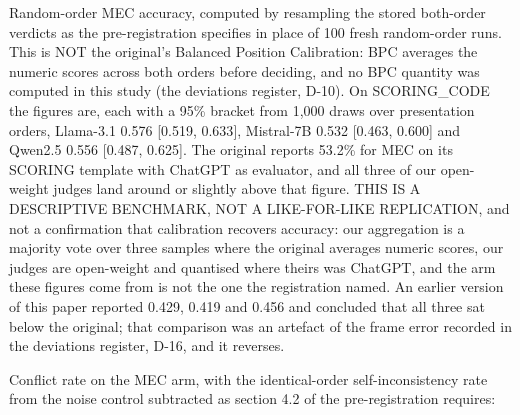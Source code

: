 Random-order MEC accuracy, computed by resampling the stored both-order verdicts as the
pre-registration specifies in place of 100 fresh random-order runs. This is NOT the original's
Balanced Position Calibration: BPC averages the numeric scores across both orders before deciding,
and no BPC quantity was computed in this study (the deviations register, D-10). On SCORING\_CODE the figures are, each with a 95\% bracket from 1,000 draws over presentation
orders, Llama-3.1 0.576
{[}0.519, 0.633{]}, Mistral-7B 0.532 {[}0.463, 0.600{]} and Qwen2.5 0.556 {[}0.487, 0.625{]}. The original reports 53.2\% for MEC on its SCORING template with ChatGPT as evaluator, and all
three of our open-weight judges land around or slightly above that figure. THIS IS A DESCRIPTIVE
BENCHMARK, NOT A LIKE-FOR-LIKE REPLICATION, and not a confirmation that calibration recovers
accuracy: our aggregation is a majority vote over three samples where the original averages
numeric scores, our judges are open-weight and quantised where theirs was ChatGPT, and the arm
these figures come from is not the one the registration named. An earlier version of this paper reported
0.429, 0.419 and 0.456 and concluded that all three sat below the original; that comparison was an
artefact of the frame error recorded in the deviations register, D-16, and it reverses.

Conflict rate on the MEC arm, with the identical-order self-inconsistency rate from the noise
control subtracted as section 4.2 of the pre-registration requires:

